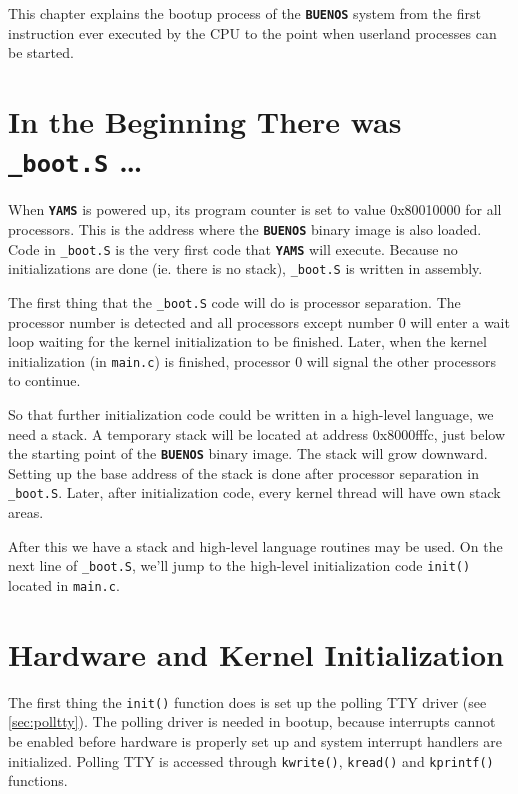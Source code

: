 \documentclass[twoside,a4paper]{report}
\newcommand{\buenos}{\texttt{\textbf{BUENOS}}}
\newcommand{\yams}{\texttt{\textbf{YAMS}}}
\begin{document}

This chapter explains the bootup process of the \buenos{} system
from the first instruction ever executed by the CPU to the point
when userland processes can be started.

\section{In the Beginning There was \texttt{\_boot.S} \ldots}

When \yams{} is powered up, its program counter is set to value
0x80010000 for all processors. This is the address where the
\buenos{} binary image is also loaded. Code in \texttt{\_boot.S} is
the very first code that \yams{} will execute. Because no
initializations are done (ie. there is no stack), \texttt{\_boot.S} is
written in assembly.

The first thing that the \texttt{\_boot.S} code will do is processor
separation. The processor number is detected and all processors except
number 0 will enter a wait loop waiting for the kernel initialization
to be finished. Later, when the kernel initialization (in
\texttt{main.c}) is finished, processor 0 will signal the other
processors to continue.

So that further initialization code could be written in a high-level
language, we need a stack. A temporary stack will be located at
address 0x8000fffc, just below the starting point of the \buenos{}
binary image. The stack will grow downward. Setting up the base
address of the stack is done after processor separation in
\texttt{\_boot.S}. Later, after initialization code, every kernel
thread will have own stack areas.

After this we have a stack and high-level language routines may be
used. On the next line of \texttt{\_boot.S}, we'll jump to the
high-level initialization code \texttt{init()} located in
\texttt{main.c}.

\section{Hardware and Kernel Initialization}

The first thing the \texttt{init()} function does is set up the
polling TTY driver (see \autoref{sec:polltty}). The polling driver is
needed in bootup, because interrupts cannot be enabled before hardware
is properly set up and system interrupt handlers are initialized.
Polling TTY is accessed through \texttt{kwrite()}, \texttt{kread()}
and \texttt{kprintf()} functions. 
\end{document}
